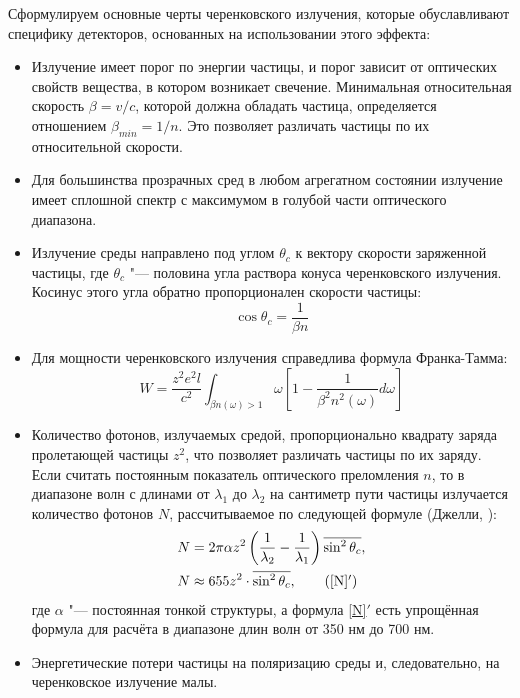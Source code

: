 \documentclass[12pt,a4paper]{report} %
\begin{document}
Сформулируем основные черты черенковского излучения, которые обуславливают специфику детекторов, основанных на использовании этого эффекта:
\begin{itemize}
	\item Излучение имеет порог по энергии частицы, и порог зависит от оптических свойств вещества, в котором возникает свечение. Минимальная относительная скорость $\beta = v/c$, которой должна обладать частица, определяется отношением $\beta_{min} = 1/n$. Это позволяет различать частицы по их относительной скорости.
	\item Для большинства прозрачных сред в любом агрегатном состоянии излучение имеет сплошной спектр с максимумом в голубой части оптического диапазона.
	\item Излучение среды направлено под углом $\theta_c$ к вектору скорости заряженной частицы, где $\theta_c$ "--- половина угла раствора конуса черенковского излучения.
	 Косинус этого угла обратно пропорционален скорости частицы: 
\begin{equation} \label{costheta}
 \cos \theta_c = \frac{1}{\beta n}
\end{equation}
	\item Для мощности черенковского излучения справедлива формула Франка-Тамма:
\begin{equation} \label{FrankTammEquation}
 W = \frac{z^2 e^2 l}{c^2} \int_{\beta n(\omega)>1}
 \omega \left[ 1 - \frac{1}{\beta^2 n^2 (\omega)} d\omega \right]
\end{equation}
	\item Количество фотонов, излучаемых средой, пропорционально квадрату заряда пролетающей частицы $z^2$, что позволяет различать частицы по их заряду. Если считать постоянным показатель оптического преломления $n$, то в диапазоне волн с длинами от $\lambda_1$  до $\lambda_2$ на сантиметр пути частицы излучается количество фотонов $N$, рассчитываемое по следующей формуле (Джелли, \cite{Jelley}):
\begin{align}
& N = 2\pi\alpha z^2 \left( \frac{1}{\lambda_2} - \frac{1}{\lambda_1} \right)\overline{\sin^2 \theta_c},\label{N} \\
& N \approx 655 z^2 \cdot \overline{\sin^2 \theta_c}, \tag{\ref{N}$'$}
\end{align}
где $\alpha$ "--- постоянная тонкой структуры, а формула \ref{N}$'$ есть упрощённая формула для расчёта в диапазоне длин волн от 350 нм до 700 нм.
	\item Энергетические потери частицы на поляризацию среды и, следовательно, на черенковское излучение малы. 
\end{itemize}
\end{document}
